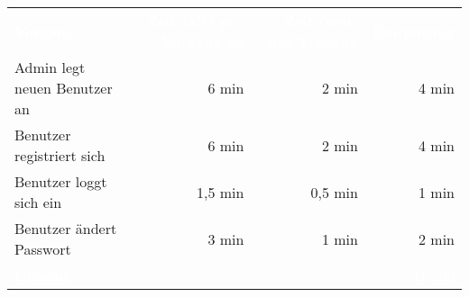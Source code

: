 \begin{tabular}{lrrr}

\rowcolor{heading}
\textcolor{white}{\textbf{Vorgang}} &
\textcolor{white}{\textbf{Zeit (alt) pro Vorgang x3}} &
\textcolor{white}{\textbf{Zeit (neu) pro Vorgang}} &
\textcolor{white}{\textbf{Einsparung}} \\





Admin legt neuen Benutzer an & 6 min     & 2 min & 4 min \\
\rowcolor{odd}Benutzer registriert sich & 6 min     & 2 min & 4 min\\
Benutzer loggt sich ein & 1,5 min  & 0,5 min & 1 min\\
\rowcolor{odd} Benutzer ändert Passwort & 3 min     & 1 min & 2 min \\
\hline
\hline
\rowcolor{heading}\textcolor{white}{\textbf{Gesamt}} &  &  & \textcolor{white}{44 min} \\
\end{tabular}
